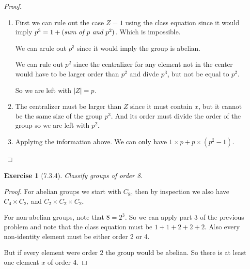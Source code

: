\documentclass[12pt]{article}
\newtheorem*{exer}{Exercise}
\begin{document}
\begin{proof}

    \begin{enumerate}
        \item First we can rule out the case $Z = 1$ using the class
            equation since it would imply $p^3 = 1 + (\text{\it{sum of
            $p$ and $p^2$}})$. Which is impossible. 

            We can arule out $p^3$ since it would imply the group is
            abelian.

            We can rule out $p^2$ since the centralizer for any element
            not in the center would have to be larger order than $p^2$
            and divde $p^3$, but not be equal to $p^2$.

            So we are left with $|Z| = p$.

        \item The centralizer must be larger than $Z$ since it must
            contain $x$, but it cannot be the same size of the group
            $p^3$. And its order must divide the order of the group so
            we are left with $p^2$.

        \item Applying the information above. We can only have $1 \times
            p + p \times (p^2 - 1)$.
            
    \end{enumerate}

\end{proof}


\begin{exer}[7.3.4]

    Classify groups of order 8.

\end{exer}

\begin{proof}

    For abelian groups we start with $C_8$, then by inspection we also
    have $C_4 \times C_2$, and $C_2 \times C_2 \times C_2$.

    For non-abelian groups, note that $8 = 2^3$. So we can apply part 3
    of the previous problem and note that the class equation must be $1
    + 1 + 2 + 2 + 2$. Also every non-identity element must be either
    order 2 or 4.

    But if every element were order 2 the group would be abelian. So
    there is at least one element $x$ of order 4. 



\end{proof}
\end{document}
